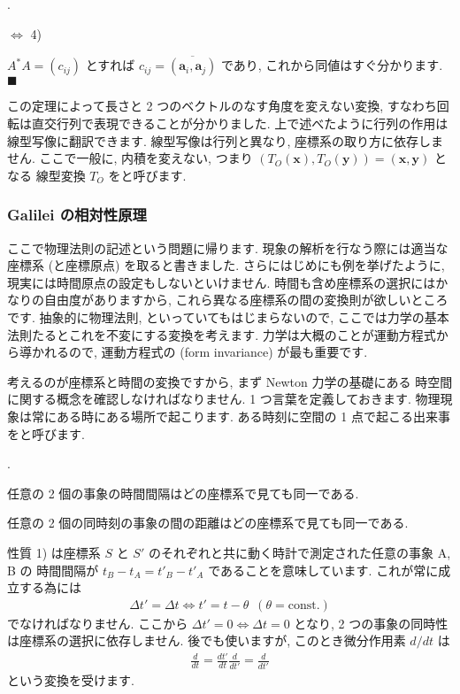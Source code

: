 \documentclass[openany, a4paper, oneside]{jsbook}
\newcounter{enum2}
\renewenvironment{enumerate}{%
\begin{list}%
{%
\arabic{enum2}.\ \,%
}%
{%
\usecounter{enum2}
\setlength{\itemindent}{0pt}%
\setlength{\leftmargin}{15pt}%
\setlength{\rightmargin}{0pt}%
\setlength{\labelsep}{0pt}%
\setlength{\labelwidth}{6pt}%
\setlength{\itemsep}{0pt}%
\setlength{\parsep}{0pt}%
\setlength{\listparindent}{0pt}%
}
}{%
\end{list}%
}
\theoremstyle{break}
\theoremstyle{breakdefn}
\begin{document}
\begin{enumerate}
\item $\Leftrightarrow$ 4)
\end{enumerate}
$A^*A=(c_{ij})$ とすれば $c_{ij}=\overline{(\bm{a}_i,\bm{a}_j)}$ であり,
これから同値はすぐ分かります.  $\blacksquare$

この定理によって長さと 2 つのベクトルのなす角度を変えない変換,
すなわち回転は直交行列で表現できることが分かりました.
上で述べたように行列の作用は線型写像に翻訳できます.
線型写像は行列と異なり, 座標系の取り方に依存しません.
ここで一般に, 内積を変えない, つまり
$( T_O ( \bm{x} ) , T_O ( \bm{y} ) ) = ( \bm{x} , \bm{y} )$ となる
線型変換  $T_O$  をと呼びます.
\subsubsection{Galilei の相対性原理}


ここで物理法則の記述という問題に帰ります.
現象の解析を行なう際には適当な座標系 (と座標原点) を取ると書きました.
さらにはじめにも例を挙げたように, 現実には時間原点の設定もしないといけません.
時間も含め座標系の選択にはかなりの自由度がありますから, これら異なる座標系の間の変換則が欲しいところです.
抽象的に物理法則, といっていてもはじまらないので,
ここでは力学の基本法則たるとこれを不変にする変換を考えます.
力学は大概のことが運動方程式から導かれるので, 運動方程式の
(form invariance) が最も重要です.

考えるのが座標系と時間の変換ですから, まず Newton 力学の基礎にある
時空間に関する概念を確認しなければなりません.
1 つ言葉を定義しておきます.
物理現象は常にある時にある場所で起こります.
ある時刻に空間の 1 点で起こる出来事をと呼びます.
\begin{enumerate}
    \item[1)] 任意の 2 個の事象の時間間隔はどの座標系で見ても同一である.
    \item[2)] 任意の 2 個の同時刻の事象の間の距離はどの座標系で見ても同一である.
\end{enumerate}
性質 1) は座標系 $S$ と $S'$ のそれぞれと共に動く時計で測定された任意の事象 A, B の
時間間隔が $t_B - t_A = t'_B - t'_A$ であることを意味しています.
これが常に成立する為には
    \begin{gather}
        \varDelta t'
        =
        \varDelta t
        \Longleftrightarrow
        t'
        =
        t - \theta \,\,\, ( \theta = \mathrm{const.} )
    \end{gather}
でなければなりません.
ここから $\varDelta t' = 0 \Leftrightarrow \varDelta t =0$ となり,
2 つの事象の同時性は座標系の選択に依存しません.
後でも使いますが, このとき微分作用素 $d/dt$ は
    \begin{gather}
        \frac{d} {dt}
        =
        \frac{dt'} {dt} \frac{d} {dt'}
        =
        \frac{d} {dt'}
    \end{gather}
という変換を受けます.
\end{document}
